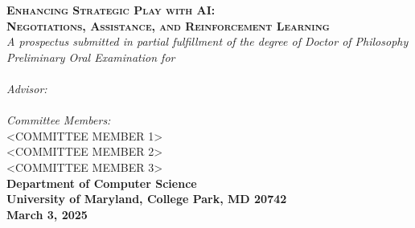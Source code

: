 \documentclass[oneside]{memoir}
\begin{document}
 

\begin{titlingpage}
\begin{center}

\textsc{\huge \bfseries {Enhancing Strategic Play with AI: }}\\[0.25cm]
\textsc{\huge \bfseries {Negotiations, Assistance, and Reinforcement Learning}}\\[0.25cm]
 
\emph{A prospectus submitted in partial fulfillment of the degree of Doctor of
Philosophy}\\[5.5cm]


\emph{Preliminary Oral Examination for}\\
\\[2.0cm] %
\emph{Advisor:} \\
\\[.5cm]
\emph{Committee Members:}\\
\textsc{<COMMITTEE MEMBER 1>}\\
\textsc{<COMMITTEE MEMBER 2>}\\
\textsc{<COMMITTEE MEMBER 3>}\\[2.0cm]

{\bfseries Department of Computer Science}\\
{\bfseries University of Maryland, College Park, MD 20742}\\
{\bfseries March 3, 2025}

\end{center}
\end{titlingpage}

\thispagestyle{empty}
\setcounter{page}{1}
\setcounter{secnumdepth}{3}

\DoubleSpacing
\end{document}
